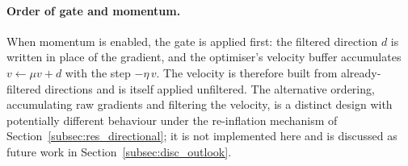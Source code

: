 \paragraph{Order of gate and momentum.} When momentum is enabled, the gate is applied first: the filtered direction $d$ is written in place of the gradient, and the optimiser's velocity buffer accumulates $v \leftarrow \mu v + d$ with the step $-\eta\,v$. The velocity is therefore built from already-filtered directions and is itself applied unfiltered. The alternative ordering, accumulating raw gradients and filtering the velocity, is a distinct design with potentially different behaviour under the re-inflation mechanism of Section~\ref{subsec:res_directional}; it is not implemented here and is discussed as future work in Section~\ref{subsec:disc_outlook}.
